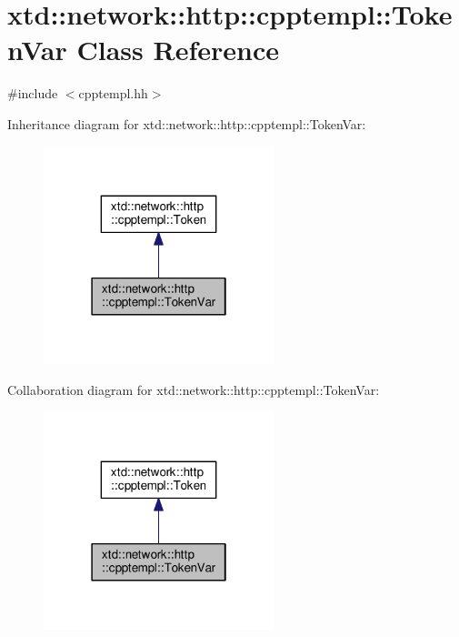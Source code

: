 \hypertarget{classxtd_1_1network_1_1http_1_1cpptempl_1_1TokenVar}{\section{xtd\-:\-:network\-:\-:http\-:\-:cpptempl\-:\-:Token\-Var Class Reference}
\label{classxtd_1_1network_1_1http_1_1cpptempl_1_1TokenVar}
}


{\ttfamily \#include $<$cpptempl.\-hh$>$}



Inheritance diagram for xtd\-:\-:network\-:\-:http\-:\-:cpptempl\-:\-:Token\-Var\-:
\nopagebreak
\begin{figure}[H]
\begin{center}
\leavevmode
\includegraphics[width=190pt]{classxtd_1_1network_1_1http_1_1cpptempl_1_1TokenVar__inherit__graph}
\end{center}
\end{figure}


Collaboration diagram for xtd\-:\-:network\-:\-:http\-:\-:cpptempl\-:\-:Token\-Var\-:
\nopagebreak
\begin{figure}[H]
\begin{center}
\leavevmode
\includegraphics[width=190pt]{classxtd_1_1network_1_1http_1_1cpptempl_1_1TokenVar__coll__graph}
\end{center}
\end{figure}
